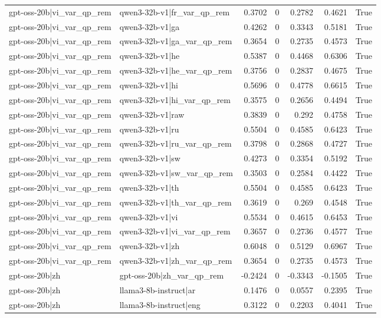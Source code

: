 \begin{table}
\begin{tabular}{l l r r r r l}
gpt-oss-20b|vi_var_qp_rem & qwen3-32b-v1|fr_var_qp_rem & 0.3702 & 0 & 0.2782 & 0.4621 & True \\
gpt-oss-20b|vi_var_qp_rem & qwen3-32b-v1|ga & 0.4262 & 0 & 0.3343 & 0.5181 & True \\
gpt-oss-20b|vi_var_qp_rem & qwen3-32b-v1|ga_var_qp_rem & 0.3654 & 0 & 0.2735 & 0.4573 & True \\
gpt-oss-20b|vi_var_qp_rem & qwen3-32b-v1|he & 0.5387 & 0 & 0.4468 & 0.6306 & True \\
gpt-oss-20b|vi_var_qp_rem & qwen3-32b-v1|he_var_qp_rem & 0.3756 & 0 & 0.2837 & 0.4675 & True \\
gpt-oss-20b|vi_var_qp_rem & qwen3-32b-v1|hi & 0.5696 & 0 & 0.4778 & 0.6615 & True \\
gpt-oss-20b|vi_var_qp_rem & qwen3-32b-v1|hi_var_qp_rem & 0.3575 & 0 & 0.2656 & 0.4494 & True \\
gpt-oss-20b|vi_var_qp_rem & qwen3-32b-v1|raw & 0.3839 & 0 & 0.292 & 0.4758 & True \\
gpt-oss-20b|vi_var_qp_rem & qwen3-32b-v1|ru & 0.5504 & 0 & 0.4585 & 0.6423 & True \\
gpt-oss-20b|vi_var_qp_rem & qwen3-32b-v1|ru_var_qp_rem & 0.3798 & 0 & 0.2868 & 0.4727 & True \\
gpt-oss-20b|vi_var_qp_rem & qwen3-32b-v1|sw & 0.4273 & 0 & 0.3354 & 0.5192 & True \\
gpt-oss-20b|vi_var_qp_rem & qwen3-32b-v1|sw_var_qp_rem & 0.3503 & 0 & 0.2584 & 0.4422 & True \\
gpt-oss-20b|vi_var_qp_rem & qwen3-32b-v1|th & 0.5504 & 0 & 0.4585 & 0.6423 & True \\
gpt-oss-20b|vi_var_qp_rem & qwen3-32b-v1|th_var_qp_rem & 0.3619 & 0 & 0.269 & 0.4548 & True \\
gpt-oss-20b|vi_var_qp_rem & qwen3-32b-v1|vi & 0.5534 & 0 & 0.4615 & 0.6453 & True \\
gpt-oss-20b|vi_var_qp_rem & qwen3-32b-v1|vi_var_qp_rem & 0.3657 & 0 & 0.2736 & 0.4577 & True \\
gpt-oss-20b|vi_var_qp_rem & qwen3-32b-v1|zh & 0.6048 & 0 & 0.5129 & 0.6967 & True \\
gpt-oss-20b|vi_var_qp_rem & qwen3-32b-v1|zh_var_qp_rem & 0.3654 & 0 & 0.2735 & 0.4573 & True \\
gpt-oss-20b|zh & gpt-oss-20b|zh_var_qp_rem & -0.2424 & 0 & -0.3343 & -0.1505 & True \\
gpt-oss-20b|zh & llama3-8b-instruct|ar & 0.1476 & 0 & 0.0557 & 0.2395 & True \\
gpt-oss-20b|zh & llama3-8b-instruct|eng & 0.3122 & 0 & 0.2203 & 0.4041 & True \\

\end{tabular}
\end{table}
